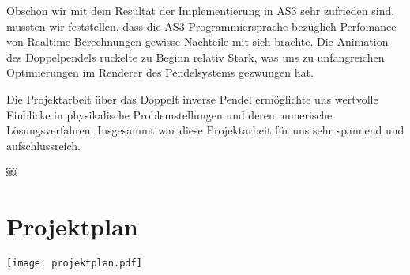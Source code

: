\documentclass[12pt]{article}
\numberwithin{equation}{subsection}
\begin{document}
Obschon wir mit dem Resultat der Implementierung in AS3 sehr zufrieden sind, mussten wir feststellen, dass die AS3 Programmiersprache bezüglich Perfomance von Realtime Berechnungen gewisse Nachteile mit sich brachte. Die Animation des Doppelpendels ruckelte zu Beginn relativ Stark, was uns zu unfangreichen Optimierungen im Renderer des Pendelsystems gezwungen hat.

Die Projektarbeit über das Doppelt inverse Pendel ermöglichte uns wertvolle Einblicke in physikalische Problemstellungen und deren numerische Lösungsverfahren. Insgesammt war diese Projektarbeit für uns sehr spannend und aufschlussreich.

\newpage
￼\listoffigures

\newpage
\nocite{*}



\appendix
\section{Projektplan}
\texttt{[image: projektplan.pdf]}
\end{document}

